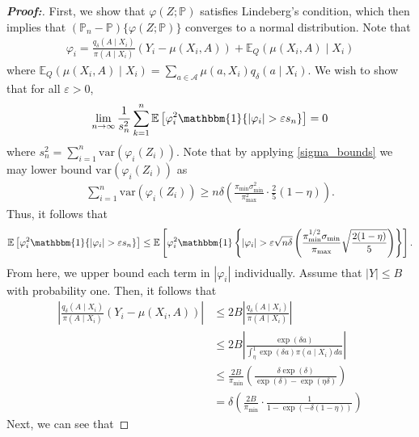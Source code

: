 \documentclass[11pt,twoside]{article}
\newcommand{\var}{\text{var}}
\theoremstyle{definition}
\theoremstyle{remark}
\begin{document}
\begin{proof}[\textbf{Proof:}]
First, we show that $\varphi(Z; \mathbb{P})$ satisfies Lindeberg's condition, which then implies that $(\mathbb{P}_n - \mathbb{P})\{\varphi(Z; \mathbb{P})\}$ converges to a normal distribution. Note that
   \begin{align*}
       \varphi_i = \frac{q_\delta(A \mid X_i)}{\pi(A \mid X_i)}\left(Y_i - \mu(X_i, A) \right)  +  \mathbb{E}_Q(\mu(X_i, A) \mid X_i)
   \end{align*}
where $\mathbb{E}_Q(\mu(X_i, A) \mid X_i) =  \sum_{a \in \mathcal{A}} \mu(a, X_i) q_\delta(a \mid X_i)$. We wish to show that for all $\varepsilon > 0$,
\begin{align*}
    \lim_{n\to\infty}\frac{1}{s_n^2}\sum_{k=1}^n\mathbb{E}\left[
    \varphi^2_i  \mathbbm{1}\{|\varphi_i|>\varepsilon s_n\}
    \right] = 0
\end{align*}
where $s^2_n = \sum^n_{i=1} \var(\varphi_i(Z_i))$. Note that by applying \cref{sigma_bounds} we may lower bound $\var(\varphi_i(Z_i))$ as
\begin{align*}
    \sum^n_{i=1} \var(\varphi_i(Z_i)) \geq  n\delta \left( \frac{\pi_{\min} \sigma^2_{\min}}{\pi^2_{\max}} \cdot \frac{2}{5}(1 - \eta) \right).
\end{align*}
Thus, it follows that 
\begin{align*}
    \mathbb{E}\left[
    \varphi^2_i \mathbbm{1}\{|\varphi_i|>\varepsilon s_n\}
    \right] \leq \mathbb{E}\left[
    \varphi^2_i \mathbbm{1}\left\{ |\varphi_i|> \varepsilon \sqrt{n \delta} \left(\frac{\pi^{1/2}_{\min} \sigma_{\min}}{\pi_{\max}} \sqrt{\frac{2(1 - \eta)}{5}} \right)\right\} 
    \right].
\end{align*}
From here, we upper bound each term in $|\varphi_i|$ individually. Assume that $|Y| \leq B$ with probability one. Then, it follows that
\begin{align*}
    \left|\frac{q_\delta(A \mid X_i)}{\pi(A \mid X_i)}\left(Y_i - \mu(X_i, A) \right) \right| 
    &\leq 2B\left|\frac{q_\delta(A \mid X_i)}{\pi(A \mid X_i)} \right| \\
    &\leq 2B\left| \frac{\exp(\delta a)}{\int^1_\eta \exp(\delta a) \pi(a \mid X_i) da } \right| \\
    &\leq \frac{2B}{\pi_{\min}} \left(\frac{\delta \exp(\delta) }{\exp(\delta) - \exp(\eta \delta)} \right) \\
    &= \delta \left( \frac{2B}{\pi_{\min}} \cdot \frac{1}{1 - \exp(-\delta(1 - \eta))}\right)
\end{align*}
Next, we can see that

\end{proof}
\end{document}
